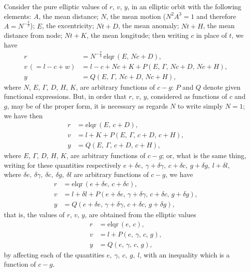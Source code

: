 \documentclass[11pt]{article}
\begin{document}
Consider the pure elliptic values of $r$, $v$, $y$, in an elliptic
orbit with the following elements: $A$, the mean distance; $N$, the
mean motion ($N^{2}A^{3} = 1$ and therefore $A = N^{-\frac{2}{3}}$);
$E$, the excentricity; $Nt + D$, the mean anomaly; $Nt + H$, the mean
distance from node; $Nt + K$, the mean longitude; then writing $c$ in
place of $t$, we have
\begin{align*}
r &= N^{-\frac{2}{3}}\,\mathrm{elqr}\,(E,\, Nc + D), \\
v\,(= l - c + w) &= l - c + Nc + K + P(E,\, \Gamma,\, Nc + D,\, Nc + H), \\
y &= Q(E,\, \Gamma,\, Nc + D,\, Nc + H),
\end{align*}
where $N$, $E$, $\Gamma$, $D$, $H$, $K$, are arbitrary functions of
$c - g$: $P$ and $Q$ denote given functional expressions. But, in
order that $r$, $v$, $y$, considered as functions of $c$ and $g$, may
be of the proper form, it is necessary as regards $N$ to write simply
$N = 1$; we have then
\begin{align*}
r &= \mathrm{elqr}\,(E,\, c + D), \\
v &= l + K + P(E,\, \Gamma,\, c + D,\, c + H), \\
y &= Q(E,\, \Gamma,\, c + D,\, c + H),
\end{align*}
where $E$, $\Gamma$, $D$, $H$, $K$, are arbitrary functions of $c - g$;
or, what is the same thing, writing for these quantities respectively
$e + \delta e,\ \gamma + \delta \gamma,\ c + \delta c,\ g + \delta g,\ l + \delta l$,
where $\delta e,\ \delta \gamma,\ \delta c,\ \delta g,\ \delta l$ are
arbitrary functions of $c - g$, we have
\begin{align*}
r &= \mathrm{elqr}\,(e + \delta e,\, c + \delta c), \\
v &= l + \delta l + P(e + \delta e,\, \gamma + \delta \gamma,\, c + \delta c,\, g + \delta g), \\
y &= Q(e + \delta e,\, \gamma + \delta \gamma,\, c + \delta c,\, g + \delta g),
\end{align*}
that is, the values of $r$, $v$, $y$, are obtained from the elliptic
values
\begin{align*}
r &= \mathrm{elqr}\,(e,\, c), \\
v &= l + P(e,\, \gamma,\, c,\, g), \\
y &= Q(e,\, \gamma,\, c,\, g),
\end{align*}
by affecting each of the quantities $e,\ \gamma,\ c,\ g,\ l$, with an
inequality which is a function of $c - g$.
\end{document}
